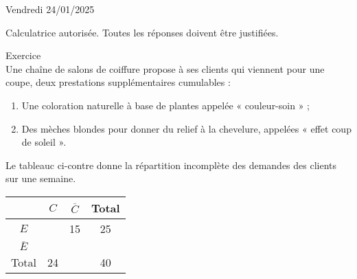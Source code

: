 \documentclass[a4paper,11pt,eval]{nsi}
\newcounter{exoNum}
\newcommand{\exo}[1]
{
	\addtocounter{exoNum}{1}
	{\titlefont\color{UGLiBlue}\Large Exercice\ \theexoNum\ \normalsize{#1}}\smallskip	
}
\begin{document}
\textcolor{UGLiBlue}{Vendredi 24/01/2025}\\
\maketitle
\begin{center}
	Calculatrice autorisée. Toutes les réponses doivent être justifiées.
\end{center}

\vspace{1cm}

\exo{}\\
Une chaîne de salons de coiffure propose à ses clients qui viennent pour une coupe, deux prestations supplémentaires cumulables :
\begin{enumerate}[label=\textbullet]
    \item Une coloration naturelle à base de plantes appelée « couleur-soin » ;
    \item Des mèches blondes pour donner du relief à la chevelure, appelées « effet coup de soleil ».
\end{enumerate}
Le tableauc ci-contre donne la répartition incomplète des demandes des clients sur une semaine.\\

{
    \begin{tabular}{|c|c|c|c|}
        \hline
        \rowcolor{UGLiOrange}& $C$ & $\overline{C}$ & Total\\
        \hline
        \cellcolor{UGLiOrange}$E$ & $ $ & 15 & 25\\
        \hline
        \cellcolor{UGLiOrange}$\overline{E}$ &\hspace*{.8cm} & \hspace*{.8cm}  & \hspace*{.8cm}\\
        \hline
        \cellcolor{UGLiOrange}Total & 24 &  & 40\\
        \hline
    \end{tabular}
}
\end{document}
